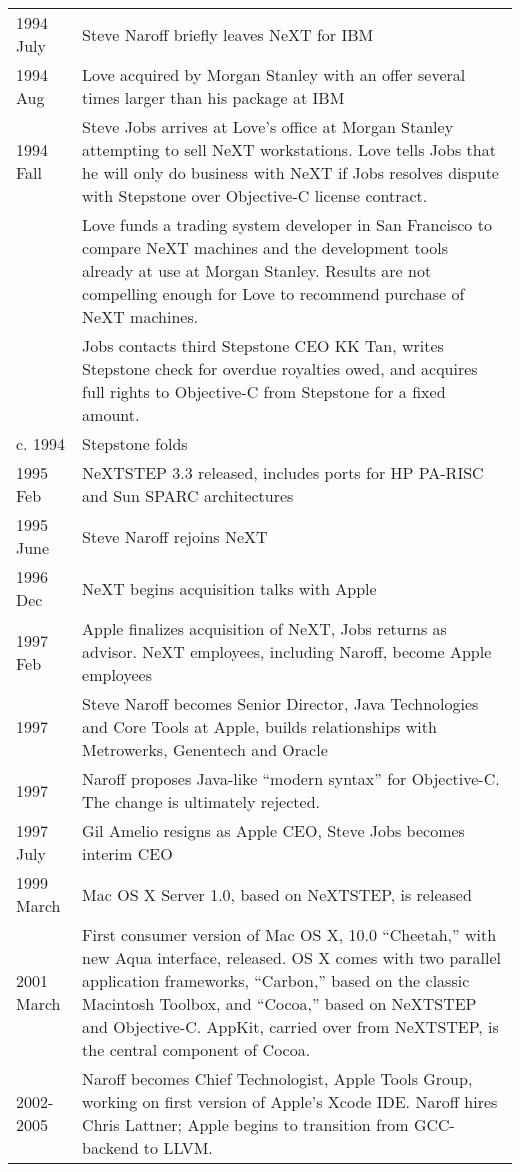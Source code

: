 \documentclass[acmsmall,screen]{acmart}
\begin{document}
\begin{longtable}{lp{4.40in}}
1994 July	& Steve Naroff briefly leaves NeXT for IBM \\
1994 Aug	& Love acquired by Morgan Stanley with an offer several times larger than his package at IBM \\
1994 Fall	& Steve Jobs arrives at Love's office at Morgan Stanley attempting to sell NeXT workstations. Love tells Jobs that he will only do business with NeXT if Jobs resolves dispute with Stepstone over Objective-C license contract. \\
	& Love funds a trading system developer in San Francisco to compare NeXT machines and the development tools already at use at Morgan Stanley. Results are not compelling enough for Love to recommend purchase of NeXT machines. \\
	& Jobs contacts third Stepstone CEO KK Tan, writes Stepstone check for overdue royalties owed, and acquires full rights to Objective-C from Stepstone for a fixed amount. \\
c. 1994 	& Stepstone folds \\
1995 Feb	& NeXTSTEP 3.3 released, includes ports for HP PA-RISC and Sun SPARC architectures \\
1995 June	& Steve Naroff rejoins NeXT \\
1996 Dec	& NeXT begins acquisition talks with Apple \\
1997 Feb	& Apple finalizes acquisition of NeXT, Jobs returns as advisor. NeXT employees, including Naroff, become Apple employees \\
1997	& Steve Naroff becomes Senior Director, Java Technologies and Core Tools at Apple, builds relationships with Metrowerks, Genentech and Oracle \\
1997	& Naroff proposes Java-like ``modern syntax'' for Objective-C. The change is ultimately rejected. \\
1997 July	& Gil Amelio resigns as Apple CEO, Steve Jobs becomes interim CEO \\
1999 March 	& Mac OS X Server 1.0, based on NeXTSTEP, is released \\
2001 March	& First consumer version of Mac OS X, 10.0 ``Cheetah,'' with new Aqua interface, released. OS X comes with two parallel application frameworks, ``Carbon,'' based on the classic Macintosh Toolbox, and ``Cocoa,'' based on NeXTSTEP and Objective-C. AppKit, carried over from NeXTSTEP, is the central component of Cocoa. \\
2002-2005	& Naroff becomes Chief Technologist, Apple Tools Group, working on first version of Apple's Xcode IDE. Naroff hires Chris Lattner; Apple begins to transition from GCC-backend to LLVM. \\

\end{longtable}
\end{document}

